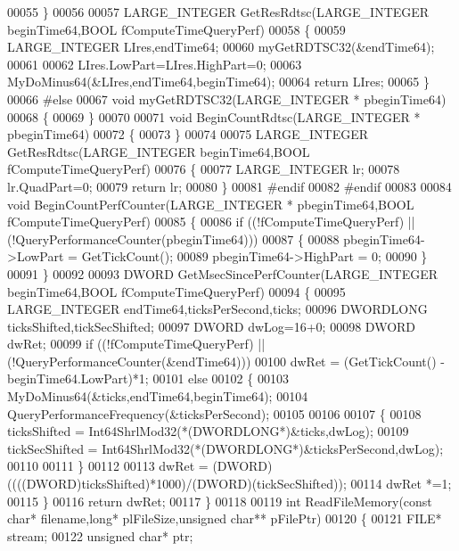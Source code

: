 \begin{DoxyCode}
{{00055 \}
00056 
00057 LARGE\_INTEGER GetResRdtsc(LARGE\_INTEGER beginTime64,BOOL fComputeTimeQueryPerf)
00058 \{
00059     LARGE\_INTEGER LIres,endTime64;
00060     myGetRDTSC32(&endTime64);
00061 
00062     LIres.LowPart=LIres.HighPart=0;
00063     MyDoMinus64(&LIres,endTime64,beginTime64);
00064     \textcolor{keywordflow}{return} LIres;
00065 \}
00066 \textcolor{preprocessor}{#else}
00067 \textcolor{keywordtype}{void} myGetRDTSC32(LARGE\_INTEGER * pbeginTime64)
00068 \{
00069 \}
00070 
00071 \textcolor{keywordtype}{void} BeginCountRdtsc(LARGE\_INTEGER * pbeginTime64)
00072 \{
00073 \}
00074 
00075 LARGE\_INTEGER GetResRdtsc(LARGE\_INTEGER beginTime64,BOOL fComputeTimeQueryPerf)
00076 \{
00077     LARGE\_INTEGER lr;
00078     lr.QuadPart=0;
00079     \textcolor{keywordflow}{return} lr;
00080 \}
00081 \textcolor{preprocessor}{#endif}
00082 \textcolor{preprocessor}{#endif}
00083 
00084 \textcolor{keywordtype}{void} BeginCountPerfCounter(LARGE\_INTEGER * pbeginTime64,BOOL fComputeTimeQueryPerf)
00085 \{
00086     \textcolor{keywordflow}{if} ((!fComputeTimeQueryPerf) || (!QueryPerformanceCounter(pbeginTime64)))
00087     \{
00088         pbeginTime64->LowPart = GetTickCount();
00089         pbeginTime64->HighPart = 0;
00090     \}
00091 \}
00092 
00093 DWORD GetMsecSincePerfCounter(LARGE\_INTEGER beginTime64,BOOL fComputeTimeQueryPerf)
00094 \{
00095     LARGE\_INTEGER endTime64,ticksPerSecond,ticks;
00096     DWORDLONG ticksShifted,tickSecShifted;
00097     DWORD dwLog=16+0;
00098     DWORD dwRet;
00099     \textcolor{keywordflow}{if} ((!fComputeTimeQueryPerf) || (!QueryPerformanceCounter(&endTime64)))
00100         dwRet = (GetTickCount() - beginTime64.LowPart)*1;
00101     \textcolor{keywordflow}{else}
00102     \{
00103         MyDoMinus64(&ticks,endTime64,beginTime64);
00104         QueryPerformanceFrequency(&ticksPerSecond);
00105 
00106 
00107         \{
00108             ticksShifted = Int64ShrlMod32(*(DWORDLONG*)&ticks,dwLog);
00109             tickSecShifted = Int64ShrlMod32(*(DWORDLONG*)&ticksPerSecond,dwLog);
00110 
00111         \}
00112 
00113         dwRet = (DWORD)((((DWORD)ticksShifted)*1000)/(DWORD)(tickSecShifted));
00114         dwRet *=1;
00115     \}
00116     \textcolor{keywordflow}{return} dwRet;
00117 \}
00118 
00119 \textcolor{keywordtype}{int} ReadFileMemory(\textcolor{keyword}{const} \textcolor{keywordtype}{char}* filename,\textcolor{keywordtype}{long}* plFileSize,\textcolor{keywordtype}{unsigned} \textcolor{keywordtype}{char}** pFilePtr)
00120 \{
00121     FILE* stream;
00122     \textcolor{keywordtype}{unsigned} \textcolor{keywordtype}{char}* ptr;
}}
\end{DoxyCode}
